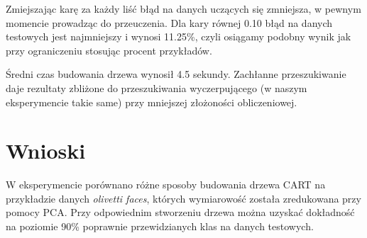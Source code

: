 \documentclass[11pt]{article}
\begin{document}
Zmiejszając karę za każdy liść błąd na danych uczących się zmniejsza, w pewnym momencie prowadząc do przeuczenia. Dla kary równej 0.10 błąd na danych testowych jest najmniejszy i wynosi 11.25\%, czyli osiągamy podobny wynik jak przy ograniczeniu stosując procent przykładów.

Średni czas budowania drzewa wynosił 4.5 sekundy. Zachłanne przeszukiwanie daje rezultaty zbliżone do przeszukiwania wyczerpującego (w naszym eksperymencie takie same) przy mniejszej złożoności obliczeniowej.

\section{Wnioski}

W eksperymencie porównano różne sposoby budowania drzewa CART na przykładzie danych \emph{olivetti faces}, których wymiarowość została zredukowana przy pomocy PCA. Przy odpowiednim stworzeniu drzewa można uzyskać dokładność na poziomie 90\% poprawnie przewidzianych klas na danych testowych.
\end{document}
